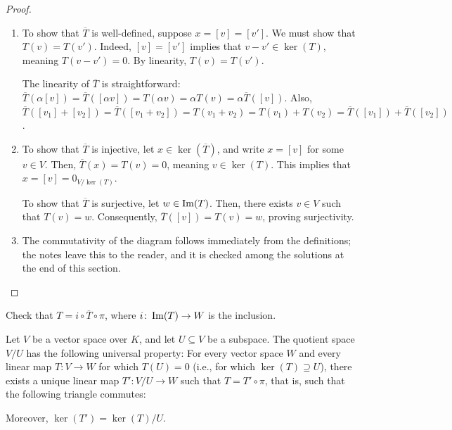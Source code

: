 \begin{proof}
  \begin{enumerate}
    \item To show that $\overline{T}$ is well-defined, suppose $x = [v] = [v']$. We must show that $T(v) = T(v')$. Indeed, $[v] = [v']$ implies that $v - v' \in \ker(T)$, meaning $T(v - v') = 0$. By linearity, $T(v) = T(v')$.

    The linearity of $\overline{T}$ is straightforward: $\overline{T}(\alpha[v]) = \overline{T}([\alpha v]) = T(\alpha v) = \alpha T(v) = \alpha \overline{T}([v])$. Also, $\overline{T}([v_1] + [v_2]) = \overline{T}([v_1 + v_2]) = T(v_1 + v_2) = T(v_1) + T(v_2) = \overline{T}([v_1]) + \overline{T}([v_2])$.

    \item To show that $\overline{T}$ is injective, let $x \in \ker(\overline{T})$, and write $x = [v]$ for some $v \in V$. Then, $\overline{T}(x) = T(v) = 0$, meaning $v \in \ker(T)$. This implies that $x = [v] = 0_{V/\ker(T)}$.

    To show that $\overline{T}$ is surjective, let $w \in \operatorname{Im}(T)$. Then, there exists $v \in V$ such that $T(v) = w$. Consequently, $\overline{T}([v]) = T(v) = w$, proving surjectivity.

    \item The commutativity of the diagram follows immediately from the definitions; the notes leave this to the reader, and it is checked among the solutions at the end of this section.
  \end{enumerate}
\end{proof}

\begin{exercise}
  \label{exc:first_iso_diagram}
  Check that $T = i \circ \overline{T} \circ \pi$, where $i \colon \operatorname{Im}(T) \to W$ is the inclusion.
\end{exercise}


\begin{theorem}
  \label{thm:universal_property_quotient}
  Let $V$ be a vector space over $K$, and let $U \subseteq V$ be a subspace. The quotient space $V/U$ has the following universal property: For every vector space $W$ and every linear map $T \colon V \to W$ for which $T(U) = 0$ (i.e., for which $\ker(T) \supseteq U$), there exists a unique linear map $T' \colon V/U \to W$ such that $T = T' \circ \pi$, that is, such that the following triangle commutes:
  \begin{center}
  \end{center}
  Moreover, $\ker(T') = \ker(T)/U$.
\end{theorem}

